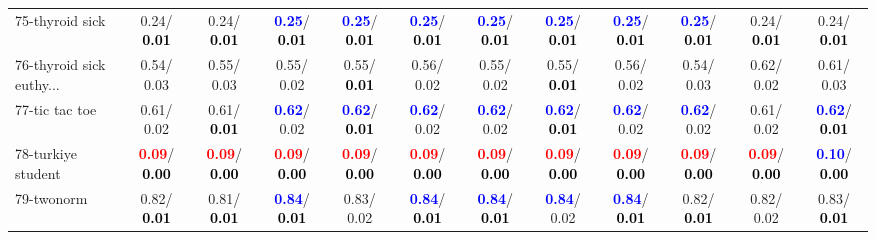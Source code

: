 \begin{table}[h]
\begin{center}
{\begin{tabular}{lc|c|c|c|c|c|c|c|c|c|c}
75-thyroid sick &   0.24/\textcolor{black}{\textbf{  0.01}} &   0.24/\textcolor{black}{\textbf{  0.01}} & \textcolor{blue}{\textbf{  0.25}}/\textcolor{black}{\textbf{  0.01}} & \textcolor{blue}{\textbf{  0.25}}/\textcolor{black}{\textbf{  0.01}} & \textcolor{blue}{\textbf{  0.25}}/\textcolor{black}{\textbf{  0.01}} & \textcolor{blue}{\textbf{  0.25}}/\textcolor{black}{\textbf{  0.01}} & \textcolor{blue}{\textbf{  0.25}}/\textcolor{black}{\textbf{  0.01}} & \textcolor{blue}{\textbf{  0.25}}/\textcolor{black}{\textbf{  0.01}} & \textcolor{blue}{\textbf{  0.25}}/\textcolor{black}{\textbf{  0.01}} &   0.24/\textcolor{black}{\textbf{  0.01}} &   0.24/\textcolor{black}{\textbf{  0.01}} \\
76-thyroid sick euthy... &   0.54/  0.03 &   0.55/  0.03 &   0.55/  0.02 &   0.55/\textcolor{black}{\textbf{  0.01}} &   0.56/  0.02 &   0.55/  0.02 &   0.55/\textcolor{black}{\textbf{  0.01}} &   0.56/  0.02 &   0.54/  0.03 &   0.62/  0.02 &   0.61/  0.03 \\
77-tic tac toe &   0.61/  0.02 &   0.61/\textcolor{black}{\textbf{  0.01}} & \textcolor{blue}{\textbf{  0.62}}/  0.02 & \textcolor{blue}{\textbf{  0.62}}/\textcolor{black}{\textbf{  0.01}} & \textcolor{blue}{\textbf{  0.62}}/  0.02 & \textcolor{blue}{\textbf{  0.62}}/  0.02 & \textcolor{blue}{\textbf{  0.62}}/\textcolor{black}{\textbf{  0.01}} & \textcolor{blue}{\textbf{  0.62}}/  0.02 & \textcolor{blue}{\textbf{  0.62}}/  0.02 &   0.61/  0.02 & \textcolor{blue}{\textbf{  0.62}}/\textcolor{black}{\textbf{  0.01}} \\
78-turkiye student & \textcolor{red}{\textbf{  0.09}}/\textcolor{black}{\textbf{  0.00}} & \textcolor{red}{\textbf{  0.09}}/\textcolor{black}{\textbf{  0.00}} & \textcolor{red}{\textbf{  0.09}}/\textcolor{black}{\textbf{  0.00}} & \textcolor{red}{\textbf{  0.09}}/\textcolor{black}{\textbf{  0.00}} & \textcolor{red}{\textbf{  0.09}}/\textcolor{black}{\textbf{  0.00}} & \textcolor{red}{\textbf{  0.09}}/\textcolor{black}{\textbf{  0.00}} & \textcolor{red}{\textbf{  0.09}}/\textcolor{black}{\textbf{  0.00}} & \textcolor{red}{\textbf{  0.09}}/\textcolor{black}{\textbf{  0.00}} & \textcolor{red}{\textbf{  0.09}}/\textcolor{black}{\textbf{  0.00}} & \textcolor{red}{\textbf{  0.09}}/\textcolor{black}{\textbf{  0.00}} & \textcolor{blue}{\textbf{  0.10}}/\textcolor{black}{\textbf{  0.00}} \\ \hline
79-twonorm &   0.82/\textcolor{black}{\textbf{  0.01}} &   0.81/\textcolor{black}{\textbf{  0.01}} & \textcolor{blue}{\textbf{  0.84}}/\textcolor{black}{\textbf{  0.01}} &   0.83/  0.02 & \textcolor{blue}{\textbf{  0.84}}/\textcolor{black}{\textbf{  0.01}} & \textcolor{blue}{\textbf{  0.84}}/\textcolor{black}{\textbf{  0.01}} & \textcolor{blue}{\textbf{  0.84}}/  0.02 & \textcolor{blue}{\textbf{  0.84}}/\textcolor{black}{\textbf{  0.01}} &   0.82/\textcolor{black}{\textbf{  0.01}} &   0.82/  0.02 &   0.83/\textcolor{black}{\textbf{  0.01}} \\

\end{tabular}}
\end{center}
\end{table}
